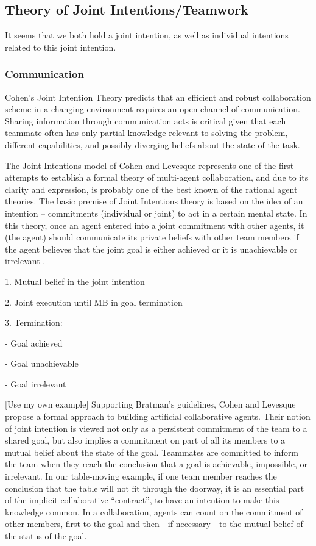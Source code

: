 \documentclass[11pt]{article}
\begin{document}
\subsection{Theory of Joint Intentions/Teamwork}
\label{sec:joint-intentions}

It seems that we both hold a joint intention, as well as individual intentions
related to this joint intention.

\subsubsection{Communication}

Cohen’s Joint Intention Theory predicts that an efficient and robust
collaboration scheme in a changing environment requires an open channel of
communication. Sharing information through communication acts is critical given
that each teammate often has only partial knowledge relevant to solving the
problem, different capabilities, and possibly diverging beliefs about the state
of the task.

The Joint Intentions model of Cohen and Levesque \cite{cohen:teamwork,
levesque:acting-together, cohen:persistence-intention-commitment,
cohen:intentions,cohen:intention-commitment} represents one of the first
attempts to establish a formal theory of multi-agent collaboration, and due to
its clarity and expression, is probably one of the best known of the rational
agent theories. The basic premise of Joint Intentions theory is based on the
idea of an intention -- commitments (individual or joint) to act in a certain
mental state. In this theory, once an agent entered into a joint commitment with
other agents, it (the agent) should communicate its private beliefs with other
team members if the agent believes that the joint goal is either achieved or it
is unachievable or irrelevant \cite{wilsker:study-theories}.

1. Mutual belief in the joint intention

2. Joint execution until MB in goal termination

3. Termination:

- Goal achieved

- Goal unachievable

- Goal irrelevant

[Use my own example] Supporting Bratman’s guidelines, Cohen and Levesque propose
a formal approach to building artificial collaborative agents. Their notion of
joint intention is viewed not only as a persistent commitment of the team to a
shared goal, but also implies a commitment on part of all its members to a
mutual belief about the state of the goal. Teammates are committed to inform the
team when they reach the conclusion that a goal is achievable, impossible, or
irrelevant. In our table-moving example, if one team member reaches the
conclusion that the table will not fit through the doorway, it is an essential
part of the implicit collaborative “contract”, to have an intention to make this
knowledge common. In a collaboration, agents can count on the commitment of
other members, first to the goal and then—if necessary—to the mutual belief of
the status of the goal.
\end{document}

